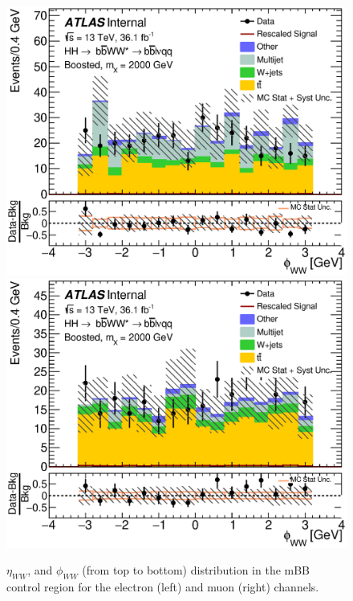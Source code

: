 \begin{figure}[h]
\begin{center}
\includegraphics[scale=0.33]{figures/kinplots/new/C_2tag_mbbcr_elec_presel_met50_WWPhi}
\includegraphics[scale=0.33]{figures/kinplots/new/C_2tag_mbbcr_muon_presel_met50_WWPhi}
\caption[Kinematic distributions in the mBB control region for the electron and muon channels]{${\eta_{WW}}$, and ${\phi_{WW}}$ (from top to bottom) distribution in the mBB control region for the electron (left) and muon (right) channels.}
\end{center}
\end{figure}
\newpage
